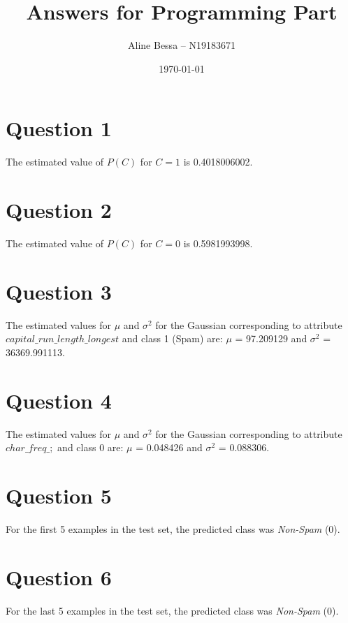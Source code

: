 \documentclass[leqno]{article}
\title{Answers for Programming Part}
\author{Aline Bessa -- N19183671}
\date\today
\begin{document}
\maketitle %

\section*{Question 1} The estimated value of $P(C)$ for $C = 1$ is 0.4018006002.


\section*{Question 2} The estimated value of $P(C)$ for $C = 0$ is 0.5981993998.


\section*{Question 3} The estimated values for $\mu$ and $\sigma^2$ for the Gaussian corresponding to attribute $capital\_run\_length\_longest$ and 
class 1 (Spam) are: $\mu$  = 97.209129 and $\sigma^2$ = 36369.991113.


\section*{Question 4}  The estimated values for $\mu$ and $\sigma^2$ for the Gaussian corresponding to attribute $char\_freq\_;$ and 
class 0 are: $\mu$ = 0.048426 and $\sigma^2$  = 0.088306.


\section*{Question 5} For the first 5 examples in the test set, the predicted class was \textit{Non-Spam} (0).


\section*{Question 6} For the last 5 examples in the test set, the predicted class was \textit{Non-Spam} (0).
\end{document}
